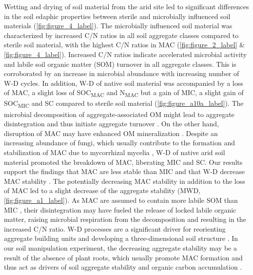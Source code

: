 Wetting and drying of soil material from the arid site led to significant differences in the soil edaphic properties between sterile and microbially influenced soil materials (\cref{fig:figure_4_label}). 
The microbially influenced soil material was characterized by increased C/N ratios in all soil aggregate classes compared to sterile soil material, with the highest C/N ratios in MAC (\cref{fig:figure_2_label} \& \cref{fig:figure_4_label}). 
Increased C/N ratios indicate accelerated microbial activity and labile soil organic matter (SOM) turnover in all aggregate classes. 
This is corroborated by an increase in microbial abundance with increasing number of W-D cycles. 
In addition, W-D of native soil material was accompanied by a loss of MAC, a slight loss of SOC\textsubscript{MAC} and N\textsubscript{MAC} but a gain of MIC, a slight gain of SOC\textsubscript{MIC} and SC compared to sterile soil material (\cref{fig:figure_a10a_label}). 
The microbial decomposition of aggregate-associated OM might lead to aggregate disintegration and thus initiate aggregate turnover \citep{Six2000}. 
On the other hand, disruption of MAC may have enhanced OM mineralization \citep{Goebel2009, Mueller2012}. 
Despite an increasing abundance of fungi, which usually contribute to the formation and stabilization of MAC due to mycorrhizal mycelia \citep{Chotte2005, Lehmann2017}, W-D of native arid soil material promoted the breakdown of MAC, liberating MIC and SC. 
Our results support the findings that MAC are less stable than MIC \citep{Six2004, Tisdall1982} and that W-D decrease MAC stability \citep{Lehrsch1991, Mulla1992, Zhang2022}. 
The potentially decreasing MAC stability in addition to the loss of MAC led to a slight decrease of the aggregate stability (MWD, \cref{fig:figure_a1_label}). 
As MAC are assumed to contain more labile SOM than MIC \citep{Elliott1986}, their disintegration may have fueled the release of locked labile organic matter, raising microbial respiration from the decomposition \citep{Najera2020} and resulting in the increased C/N ratio. 
W-D processes are a significant driver for reorienting aggregate building units and developing a three-dimensional soil structure \citep{Chenu2011}. 
In our soil manipulation experiment, the decreasing aggregate stability may be a result of the absence of plant roots, which usually promote MAC formation and thus act as drivers of soil aggregate stability and organic carbon accumulation \citep{Blankinship2016, Erktan2016, Rodriguez2024}.


